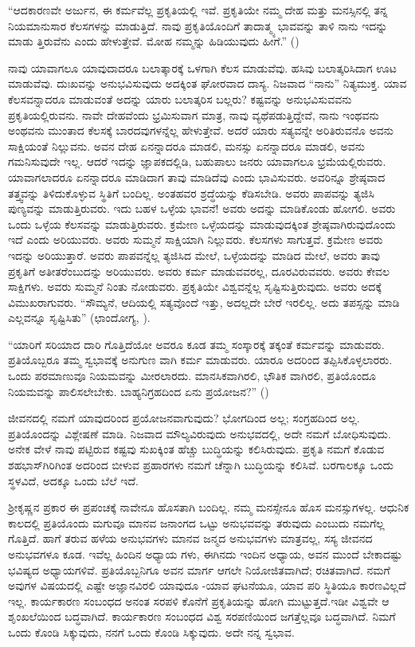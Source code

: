 “ಆದಕಾರಣವೇ ಅರ್ಜುನ, ಈ ಕರ್ಮವೆಲ್ಲ ಪ್ರಕೃತಿಯಲ್ಲಿ ಇವೆ. ಪ್ರಕೃತಿಯೇ ನಮ್ಮ ದೇಹ ಮತ್ತು ಮನಸ್ಸಿನಲ್ಲಿ ತನ್ನ ನಿಯಮಾನುಸಾರ ಕೆಲಸಗಳನ್ನು ಮಾಡುತ್ತಿದೆ. ನಾವು ಪ್ರಕೃತಿಯೊಂದಿಗೆ ತಾದಾತ್ಮ್ಯ ಭಾವವನ್ನು ತಾಳಿ ನಾನು ಇದನ್ನು ಮಾಡು ತ್ತಿರುವೆನು ಎಂದು ಹೇಳುತ್ತೇವೆ. ಮೋಹ ನಮ್ಮನ್ನು ಹಿಡಿಯುವುದು ಹೀಗೆ.” ()

ನಾವು ಯಾವಾಗಲೂ ಯಾವುದಾದರೂ ಬಲಾತ್ಕಾರಕ್ಕೆ ಒಳಗಾಗಿ ಕೆಲಸ ಮಾಡುವೆವು. ಹಸಿವು ಬಲಾತ್ಕರಿಸಿದಾಗ ಊಟ ಮಾಡುವೆವು. ದುಃಖವನ್ನು ಅನುಭವಿಸುವುದು ಅದಕ್ಕಿಂತ ಘೋರವಾದ ದಾಸ್ಯ. ನಿಜವಾದ “ನಾನು” ನಿತ್ಯಮುಕ್ತ. ಯಾವ ಕೆಲಸವನ್ನಾದರೂ ಮಾಡುವಂತೆ ಅದನ್ನು ಯಾರು ಬಲಾತ್ಕರಿಸ ಬಲ್ಲರು? ಕಷ್ಟವನ್ನು ಅನುಭವಿಸುವವನು ಪ್ರಕೃತಿಯಲ್ಲಿರುವನು. ನಾವೇ ದೇಹವೆಂದು ಭ್ರಮಿಸುವಾಗ ಮಾತ್ರ, ನಾವು ವ್ಯಥೆಪಡುತ್ತಿದ್ದೇವೆ, ನಾನು ಇಂಥವನು ಅಂಥವನು ಮುಂತಾದ ಕೆಲಸಕ್ಕೆ ಬಾರದವುಗಳನ್ನೆಲ್ಲ ಹೇಳುತ್ತೇವೆ. ಅದರೆ ಯಾರು ಸತ್ಯವನ್ನೇ ಅರಿತಿರುವನೊ ಅವನು ಸಾಕ್ಷಿಯಂತೆ ನಿಲ್ಲುವನು. ಅವನ ದೇಹ ಏನನ್ನಾದರೂ ಮಾಡಲಿ, ಮನಸ್ಸು ಏನನ್ನಾದರೂ ಮಾಡಲಿ, ಅವನು ಗಮನಿಸುವುದೇ ಇಲ್ಲ. ಆದರೆ ಇದನ್ನು ಜ್ಞಾಪಕದಲ್ಲಿಡಿ, ಬಹುಪಾಲು ಜನರು ಯಾವಾಗಲೂ ಭ್ರಮೆಯಲ್ಲಿರುವರು. ಯಾವಾಗಲಾದರೂ ಏನನ್ನಾದರೂ ಮಾಡಿದಾಗ ತಾವು ಮಾಡಿದೆವು ಎಂದು ಭಾವಿಸುವರು. ಅವರಿನ್ನೂ ಶ್ರೇಷ್ಠವಾದ ತತ್ತ್ವವನ್ನು ತಿಳಿದುಕೊಳ್ಳುವ ಸ್ಥಿತಿಗೆ ಬಂದಿಲ್ಲ. ಅಂತಹವರ ಶ್ರದ್ಧೆಯನ್ನು ಕೆಡಿಸಬೇಡಿ. ಅವರು ಪಾಪವನ್ನು ತ್ಯಜಿಸಿ ಪುಣ್ಯವನ್ನು ಮಾಡುತ್ತಿರುವರು. ಇದು ಬಹಳ ಒಳ್ಳೆಯ ಭಾವನೆ! ಅವರು ಅದನ್ನು ಮಾಡಿಕೊಂಡು ಹೋಗಲಿ. ಅವರು ಒಂದು ಒಳ್ಳೆಯ ಕೆಲಸವನ್ನು ಮಾಡುತ್ತಿರುವರು. ಕ್ರಮೇಣ ಒಳ್ಳೆಯದನ್ನು ಮಾಡುವುದಕ್ಕಿಂತ ಶ್ರೇಷ್ಠವಾಗಿರುವುದೊಂದು ಇದೆ ಎಂದು ಅರಿಯುವರು. ಅವರು ಸುಮ್ಮನೆ ಸಾಕ್ಷಿಯಾಗಿ ನಿಲ್ಲುವರು. ಕೆಲಸಗಳು ಸಾಗುತ್ತವೆ. ಕ್ರಮೇಣ ಅವರು ಇದನ್ನು ಅರಿಯುತ್ತಾರೆ. ಅವರು ಪಾಪವನ್ನೆಲ್ಲ ತ್ಯಜಿಸಿದ ಮೇಲೆ, ಒಳ್ಳೆಯದನ್ನು ಮಾಡಿದ ಮೇಲೆ, ಅವರು ತಾವು ಪ್ರಕೃತಿಗೆ ಅತೀತರೆಂಬುದನ್ನು ಅರಿಯುವರು. ಅವರು ಕರ್ಮ ಮಾಡುವವರಲ್ಲ, ದೂರವಿರುವವರು. ಅವರು ಕೇವಲ ಸಾಕ್ಷಿಗಳು. ಅವರು ಸುಮ್ಮನೆ ನಿಂತು ನೋಡುವರು. ಪ್ರಕೃತಿಯೇ ವಿಶ್ವವನ್ನೆಲ್ಲ ಸೃಷ್ಟಿಸುತ್ತಿರುವುದು. ಅವರು ಅದಕ್ಕೆ ವಿಮುಖರಾಗುವರು. “ಸೌಮ್ಯನೆ, ಆದಿಯಲ್ಲಿ ಸತ್ಯವೊಂದೆ ಇತ್ತು, ಅದಲ್ಲದೇ ಬೇರೆ ಇರಲಿಲ್ಲ. ಅದು ತಪಸ್ಸನ್ನು ಮಾಡಿ ಎಲ್ಲವನ್ನೂ ಸೃಷ್ಟಿಸಿತು” (ಛಾಂದೋಗ್ಯ, ).

“ಯಾರಿಗೆ ಸರಿಯಾದ ದಾರಿ ಗೊತ್ತಿದೆಯೋ ಅವರೂ ಕೂಡ ತಮ್ಮ ಸಂಸ್ಕಾರಕ್ಕೆ ತಕ್ಕಂತೆ ಕರ್ಮವನ್ನು ಮಾಡುವರು. ಪ್ರತಿಯೊಬ್ಬರೂ ತಮ್ಮ ಸ್ವಭಾವಕ್ಕೆ ಅನುಗುಣ ವಾಗಿ ಕರ್ಮ ಮಾಡುವರು. ಯಾರೂ ಅದರಿಂದ ತಪ್ಪಿಸಿಕೊಳ್ಳಲಾರರು. ಒಂದು ಪರಮಾಣುವೂ ನಿಯಮವನ್ನು ಮೀರಲಾರದು. ಮಾನಸಿಕವಾಗಿರಲಿ, ಭೌತಿಕ ವಾಗಿರಲಿ, ಪ್ರತಿಯೊಂದೂ ನಿಯಮವನ್ನು ಪಾಲಿಸಲೇಬೇಕು. ಬಾಹ್ಯನಿಗ್ರಹದಿಂದ ಏನು ಪ್ರಯೋಜನ?” ()

ಜೀವನದಲ್ಲಿ ನಮಗೆ ಯಾವುದರಿಂದ ಪ್ರಯೋಜನವಾಗುವುದು? ಭೋಗದಿಂದ ಅಲ್ಲ; ಸಂಗ್ರಹದಿಂದ ಅಲ್ಲ. ಪ್ರತಿಯೊಂದನ್ನು ವಿಶ್ಲೇಷಣೆ ಮಾಡಿ. ನಿಜವಾದ ಮೌಲ್ಯವಿರುವುದು ಅನುಭವದಲ್ಲಿ, ಅದೇ ನಮಗೆ ಬೋಧಿಸುವುದು. ಅನೇಕ ವೇಳೆ ನಾವು ಪಟ್ಟಿರುವ ಕಷ್ಟವು ಸುಖಕ್ಕಿಂತ ಹೆಚ್ಚು ಬುದ್ಧಿಯನ್ನು ಕಲಿಸಿರುವುದು. ಪ್ರಕೃತಿ ನಮಗೆ ಕೊಡುವ ಶಹಭಾಸ್​ಗಿರಿಗಿಂತ ಅದರಿಂದ ಬೀಳುವ ಪ್ರಹಾರಗಳು ನಮಗೆ ಚೆನ್ನಾಗಿ ಬುದ್ಧಿಯನ್ನು ಕಲಿಸಿವೆ. ಬರಗಾಲಕ್ಕೂ ಒಂದು ಸ್ಥಳವಿದೆ, ಅದಕ್ಕೂ ಒಂದು ಬೆಲೆ ಇದೆ.

ಶ‍್ರೀಕೃಷ್ಣನ ಪ್ರಕಾರ ಈ ಪ್ರಪಂಚಕ್ಕೆ ನಾವೇನೂ ಹೊಸತಾಗಿ ಬಂದಿಲ್ಲ. ನಮ್ಮ ಮನಸ್ಸೇನೂ ಹೊಸ ಮನಸ್ಸುಗಳಲ್ಲ. ಆಧುನಿಕ ಕಾಲದಲ್ಲಿ ಪ್ರತಿಯೊಂದು ಮಗುವೂ ಮಾನವ ಜನಾಂಗದ ಒಟ್ಟು ಅನುಭವವನ್ನು ತರುವುದು ಎಂಬುದು ನಮಗೆಲ್ಲ ಗೊತ್ತಿದೆ. ಹಾಗೆ ತರುವ ಹಳೆಯ ಅನುಭವಗಳು ಮಾನವ ಜನ್ಮದ ಅನುಭವಗಳು ಮಾತ್ರವಲ್ಲ, ಸಸ್ಯ ಜೀವನದ ಅನುಭವಗಳೂ ಕೂಡ. ಇವೆಲ್ಲ ಹಿಂದಿನ ಅಧ್ಯಾಯ ಗಳು, ಈಗಿನದು ಇಂದಿನ ಅಧ್ಯಾಯ, ಅವನ ಮುಂದೆ ಬೇಕಾದಷ್ಟು ಭವಿಷ್ಯದ ಅಧ್ಯಾಯಗಳಿವೆ. ಪ್ರತಿಯೊಬ್ಬನಿಗೂ ಅವನ ಮಾರ್ಗ ಆಗಲೇ ನಿಯೋಜಿತವಾಗಿದೆ; ರಚಿತವಾಗಿದೆ. ನಮಗೆ ಅವುಗಳ ವಿಷಯದಲ್ಲಿ ಎಷ್ಟೇ ಅಜ್ಞಾನವಿರಲಿ ಯಾವುದೂ -ಯಾವ ಘಟನೆಯೂ, ಯಾವ ಪರಿ ಸ್ಥಿತಿಯೂ ಕಾರಣವಿಲ್ಲದೆ ಇಲ್ಲ. ಕಾರ್ಯಕಾರಣ ಸಂಬಂಧದ ಅನಂತ ಸರಪಳಿ ಕೊನೆಗೆ ಪ್ರಕೃತಿಯನ್ನು ಹೋಗಿ ಮುಟ್ಟುತ್ತದೆ.ಇಡೀ ವಿಶ್ವವೇ ಆ ಶೃಂಖಲೆಯಿಂದ ಬದ್ಧವಾಗಿದೆ. ಕಾರ್ಯಕಾರಣ ಸಂಬಂಧದ ವಿಶ್ವ ಸರಪಣಿಯಿಂದ ಜಗತ್ತೆಲ್ಲವೂ ಬದ್ಧವಾಗಿದೆ. ನಿಮಗೆ ಒಂದು ಕೊಂಡಿ ಸಿಕ್ಕುವುದು, ನನಗೆ ಒಂದು ಕೊಂಡಿ ಸಿಕ್ಕುವುದು. ಅದೇ ನನ್ನ ಸ್ವಭಾವ.

